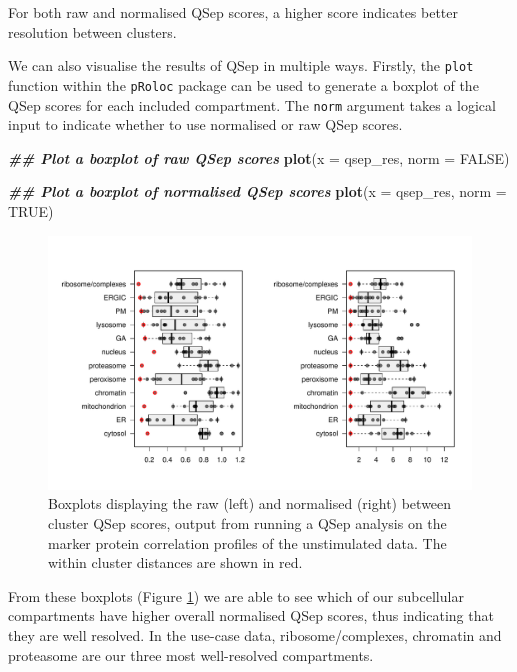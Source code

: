 \documentclass[9pt,a4paper,]{extarticle}
\newenvironment{Shaded}{\begin{snugshade}}{\end{snugshade}}
\newcommand{\AttributeTok}[1]{\textcolor[rgb]{0.13,0.29,0.53}{#1}}
\newcommand{\ConstantTok}[1]{\textcolor[rgb]{0.56,0.35,0.01}{#1}}
\newcommand{\DocumentationTok}[1]{\textcolor[rgb]{0.56,0.35,0.01}{\textbf{\textit{#1}}}}
\newcommand{\FunctionTok}[1]{\textcolor[rgb]{0.13,0.29,0.53}{\textbf{#1}}}
\newcommand{\NormalTok}[1]{#1}
\begin{document}
For both raw and normalised QSep scores, a higher score indicates better
resolution between clusters.

We can also visualise the results of QSep in multiple ways. Firstly, the \texttt{plot}
function within the \texttt{pRoloc} package can be used to generate a boxplot of the
QSep scores for each included compartment. The \texttt{norm} argument takes a logical
input to indicate whether to use normalised or raw QSep scores.

\begin{Shaded}
\begin{Highlighting}[]
\DocumentationTok{\#\# Plot a boxplot of raw QSep scores}
\FunctionTok{plot}\NormalTok{(}\AttributeTok{x =}\NormalTok{ qsep\_res, }\AttributeTok{norm =} \ConstantTok{FALSE}\NormalTok{)}

\DocumentationTok{\#\# Plot a boxplot of normalised QSep scores}
\FunctionTok{plot}\NormalTok{(}\AttributeTok{x =}\NormalTok{ qsep\_res, }\AttributeTok{norm =} \ConstantTok{TRUE}\NormalTok{)}
\end{Highlighting}
\end{Shaded}

\begin{figure}[H]

{\centering \includegraphics[width=1\linewidth,]{figs/qsep_boxplots} 

}

\caption{Boxplots displaying the raw (left) and normalised (right) between cluster QSep scores, output from running a QSep analysis on the marker protein correlation profiles of the unstimulated data. The within cluster distances are shown in red.}\label{fig:qsep-fig}
\end{figure}

From these boxplots (Figure \ref{fig:qsep-fig}) we are able to see which of our subcellular compartments have
higher overall normalised QSep scores, thus indicating that they are well
resolved. In the use-case data, ribosome/complexes, chromatin and proteasome
are our three most well-resolved compartments.
\end{document}
